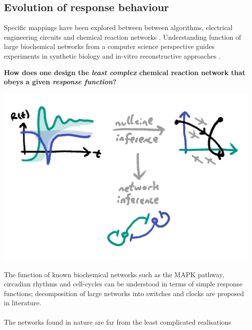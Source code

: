 \documentclass[a0,portrait]{a0poster}
\begin{document}
\begin{multicols}{3} %

\section{Evolution of response behaviour}

Specific mappings have been explored between between algorithms, electrical
engineering circuits and chemical reaction networks \cite{}. Understanding function
of large biochemical networks from a computer science perspective guides experiments
in synthetic biology and in-vitro reconstructive approaches \cite{}.
\\
\begin{tcolorbox}[boxrule=2pt,arc=3.4pt,boxsep=2mm]
\begin{center}\color{DarkRed}
\textbf{How does one design the \textit{least complex} chemical
reaction network that obeys a given \textit{response function}?}
\end{center}
\end{tcolorbox}
\begin{center}
\includegraphics[width=1.0\linewidth]{inference}
\end{center}\noindent
The function of known biochemical networks such as the MAPK pathway,
circadian rhythms and cell-cycles can be understood in terms of simple
response functions; decomposition of large networks into switches and
clocks are proposed in literature.
\\\\
The networks found in nature are far from the least complicated realisations

\end{multicols}
\end{document}
